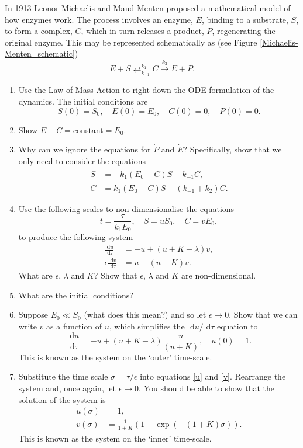 \documentclass[]{article}
\newcommand{\bb}{\begin{equation}}
\newcommand{\ee}{\end{equation}}
\newcommand{\rd}{\text{ d}}
\newcommand{\see}[1]{(see Figure \ref{#1})}
\newcommand{\eqns}[2]{equations \eqref{#1} and \eqref{#2}}
\renewcommand{\l}{\left(}
\renewcommand{\r}{\right)}
\begin{document}
In 1913 Leonor Michaelis and Maud Menten proposed a mathematical model of how enzymes work. The process involves an enzyme, $E$, binding to a substrate, $S$, to form a complex, $C$, which in turn releases a product, $P$, regenerating the original enzyme. This may be represented schematically as \see{Michaelis-Menten_schematic}
\bb
E+S\mathrel{\mathop{\rightleftarrows}^{k_1}_{k_{-1}}}C\stackrel{k_2}{\rightarrow}E+P.
\ee
\begin{enumerate}
\item Use the Law of Mass Action to right down the ODE formulation of the dynamics. The initial conditions are
\bb 
S(0) = S_0,\quad E(0) = E_0,\quad C(0) = 0,\quad P(0) = 0.
\ee
\item Show $E+C=$constant$=E_0$.
\item Why can we ignore the equations for $\dot{P}$ and $\dot{E}$? Specifically, show that we only need to consider the equations
\begin{align}
\dot{S}&=-k_1(E_0-C)S + k_{-1}C,\\
\dot{C}&=k_1(E_0-C)S -( k_{-1}+k_2)C.
\end{align}
\item Use the following scales to non-dimensionalise the equations
\bb
t=\frac{\tau}{k_1E_0},\quad S=u S_0,\quad C=v E_0,
\ee
to produce the following system
\begin{align}
\frac{\rd u}{\rd \tau}&=-u+(u+K-\lambda)v,\label{u}\\
\epsilon\frac{\rd v}{\rd \tau}&=u-(u+K)v\label{v}.
\end{align}
What are $\epsilon$, $\lambda$ and $K$? Show that $\epsilon$, $\lambda$ and $K$ are non-dimensional.
\item What are the initial conditions?
\item Suppose $E_0\ll S_0$ (what does this mean?) and so let $\epsilon\rightarrow0$. Show that we can write $v$ as a function of $u$, which simplifies the $\rd u/\rd \tau$ equation to
\bb
\frac{\rd u}{\rd \tau}=-u+(u+K-\lambda)\frac{u}{(u+K)}, \quad u(0)=1.
\ee \label{Outer}
This is known as the system on the `outer' time-scale.
\item \label{Inner} Substitute the time scale $\sigma=\tau/\epsilon$ into \eqns{u}{v}. Rearrange the system and, once again, let $\epsilon \rightarrow 0$. You should be able to show that the solution of the system is
\begin{align}
u(\sigma)&=1,\nonumber\\
v(\sigma)&= \frac{1}{1+K}\l 1-\exp(-(1+K)\sigma)\r.
\end{align}
This is known as the system on the `inner' time-scale.
\end{enumerate}
\end{document}
